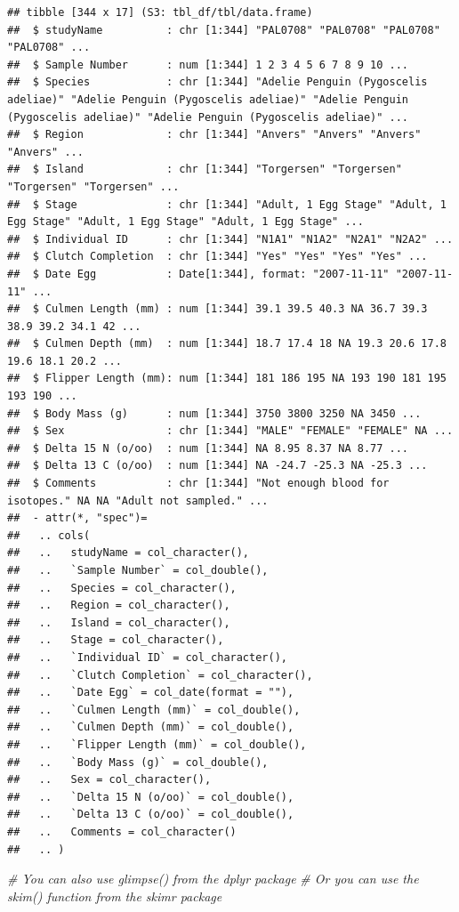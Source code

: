 \documentclass[
]{book}
\newenvironment{Shaded}{\begin{snugshade}}{\end{snugshade}}
\newcommand{\CommentTok}[1]{\textcolor[rgb]{0.56,0.35,0.01}{\textit{#1}}}
\begin{document}
\begin{verbatim}
## tibble [344 x 17] (S3: tbl_df/tbl/data.frame)
##  $ studyName          : chr [1:344] "PAL0708" "PAL0708" "PAL0708" "PAL0708" ...
##  $ Sample Number      : num [1:344] 1 2 3 4 5 6 7 8 9 10 ...
##  $ Species            : chr [1:344] "Adelie Penguin (Pygoscelis adeliae)" "Adelie Penguin (Pygoscelis adeliae)" "Adelie Penguin (Pygoscelis adeliae)" "Adelie Penguin (Pygoscelis adeliae)" ...
##  $ Region             : chr [1:344] "Anvers" "Anvers" "Anvers" "Anvers" ...
##  $ Island             : chr [1:344] "Torgersen" "Torgersen" "Torgersen" "Torgersen" ...
##  $ Stage              : chr [1:344] "Adult, 1 Egg Stage" "Adult, 1 Egg Stage" "Adult, 1 Egg Stage" "Adult, 1 Egg Stage" ...
##  $ Individual ID      : chr [1:344] "N1A1" "N1A2" "N2A1" "N2A2" ...
##  $ Clutch Completion  : chr [1:344] "Yes" "Yes" "Yes" "Yes" ...
##  $ Date Egg           : Date[1:344], format: "2007-11-11" "2007-11-11" ...
##  $ Culmen Length (mm) : num [1:344] 39.1 39.5 40.3 NA 36.7 39.3 38.9 39.2 34.1 42 ...
##  $ Culmen Depth (mm)  : num [1:344] 18.7 17.4 18 NA 19.3 20.6 17.8 19.6 18.1 20.2 ...
##  $ Flipper Length (mm): num [1:344] 181 186 195 NA 193 190 181 195 193 190 ...
##  $ Body Mass (g)      : num [1:344] 3750 3800 3250 NA 3450 ...
##  $ Sex                : chr [1:344] "MALE" "FEMALE" "FEMALE" NA ...
##  $ Delta 15 N (o/oo)  : num [1:344] NA 8.95 8.37 NA 8.77 ...
##  $ Delta 13 C (o/oo)  : num [1:344] NA -24.7 -25.3 NA -25.3 ...
##  $ Comments           : chr [1:344] "Not enough blood for isotopes." NA NA "Adult not sampled." ...
##  - attr(*, "spec")=
##   .. cols(
##   ..   studyName = col_character(),
##   ..   `Sample Number` = col_double(),
##   ..   Species = col_character(),
##   ..   Region = col_character(),
##   ..   Island = col_character(),
##   ..   Stage = col_character(),
##   ..   `Individual ID` = col_character(),
##   ..   `Clutch Completion` = col_character(),
##   ..   `Date Egg` = col_date(format = ""),
##   ..   `Culmen Length (mm)` = col_double(),
##   ..   `Culmen Depth (mm)` = col_double(),
##   ..   `Flipper Length (mm)` = col_double(),
##   ..   `Body Mass (g)` = col_double(),
##   ..   Sex = col_character(),
##   ..   `Delta 15 N (o/oo)` = col_double(),
##   ..   `Delta 13 C (o/oo)` = col_double(),
##   ..   Comments = col_character()
##   .. )
\end{verbatim}

\begin{Shaded}
\begin{Highlighting}[]
\CommentTok{\# You can also use glimpse() from the dplyr package}
\CommentTok{\# Or you can use the skim() function from the skimr package}
\end{Highlighting}
\end{Shaded}
\end{document}
